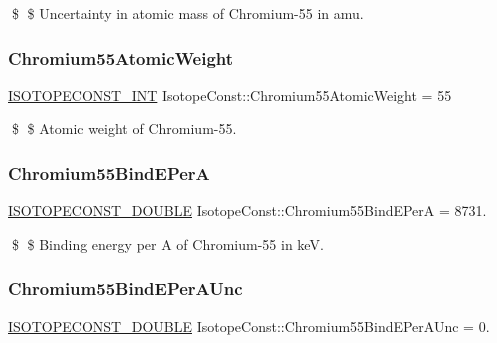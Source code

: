 \$ \$ Uncertainty in atomic mass of Chromium-\/55 in amu. \mbox{\label{group___isotope_const-_chromium-_cr55_ga48a5785f611dd3dc1adcb9368db0c6df}} 
\subsubsection{\texorpdfstring{Chromium55\+Atomic\+Weight}{Chromium55AtomicWeight}}
{\footnotesize\ttfamily \mbox{\hyperlink{group___isotope_const-_macros_ga5f18360b3e99483a35c32d789e62621c}{I\+S\+O\+T\+O\+P\+E\+C\+O\+N\+S\+T\+\_\+\+I\+NT}} Isotope\+Const\+::\+Chromium55\+Atomic\+Weight = 55}

\$ \$ Atomic weight of Chromium-\/55. \mbox{\label{group___isotope_const-_chromium-_cr55_ga697d3d6f8e7045f2dac462508fa0aebb}} 
\subsubsection{\texorpdfstring{Chromium55\+Bind\+E\+PerA}{Chromium55BindEPerA}}
{\footnotesize\ttfamily \mbox{\hyperlink{group___isotope_const-_macros_ga8f45a7272ce02c0b4c65c44636ed719a}{I\+S\+O\+T\+O\+P\+E\+C\+O\+N\+S\+T\+\_\+\+D\+O\+U\+B\+LE}} Isotope\+Const\+::\+Chromium55\+Bind\+E\+PerA = 8731.}

\$ \$ Binding energy per A of Chromium-\/55 in keV. \mbox{\label{group___isotope_const-_chromium-_cr55_ga909062d357866428baed097b95c33530}} 
\subsubsection{\texorpdfstring{Chromium55\+Bind\+E\+Per\+A\+Unc}{Chromium55BindEPerAUnc}}
{\footnotesize\ttfamily \mbox{\hyperlink{group___isotope_const-_macros_ga8f45a7272ce02c0b4c65c44636ed719a}{I\+S\+O\+T\+O\+P\+E\+C\+O\+N\+S\+T\+\_\+\+D\+O\+U\+B\+LE}} Isotope\+Const\+::\+Chromium55\+Bind\+E\+Per\+A\+Unc = 0.}

